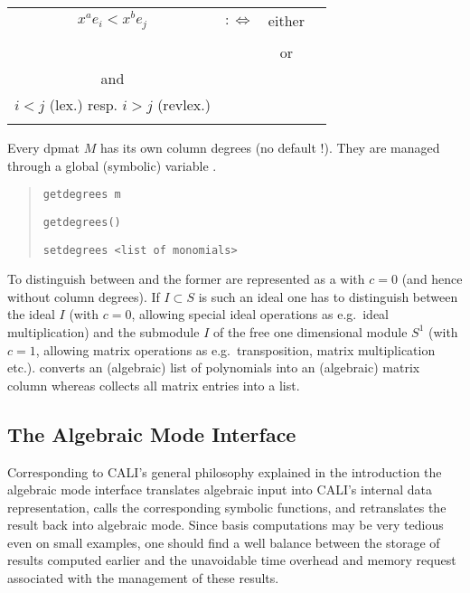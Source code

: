 \begin{tabular}{cccp{6cm}}
$x^ae_i<x^be_j$ & $:\Leftrightarrow$ & either &
{\centering $x^ax^{a_i}<x^bx^{a_j}$ in $S$\\}\\ 
& & or &
{\centering $x^ax^{a_i}=x^bx^{a_j}$ \\ and \\
$i<j$ (lex.) resp. $i>j$ (revlex.)\\}
\end{tabular}

Every dpmat $M$ has its own column degrees (no default !).  They are
managed through a global (symbolic) variable .
\begin{quote}
\verb|getdegrees m| 


\verb|getdegrees()| 


\verb|setdegrees <list of monomials>|  

\end{quote}

To distinguish between  and  the former are
represented as a  with $c=0$ (and hence without column
degrees).  If $I \subset S$ is such an ideal one has to distinguish
between the ideal $I$ (with $c=0$, allowing special ideal operations
as e.g.\ ideal multiplication) and the submodule $I$ of the free
one dimensional module $S^1$ (with $c=1$, allowing matrix operations
as e.g.\  transposition, matrix multiplication etc.). 
converts an (algebraic) list of polynomials into an (algebraic)
matrix column whereas  collects all matrix entries into
a list.

\subsection{The Algebraic Mode Interface}

Corresponding to CALI's general philosophy explained in the
introduction the algebraic mode interface translates algebraic input
into CALI's internal data representation, calls the corresponding
symbolic functions, and retranslates the result back into algebraic
mode. Since \gr basis computations may be very tedious even on small
examples, one should find a well balance between the storage of
results computed earlier and the unavoidable time overhead and memory
request associated with the management of these results.

